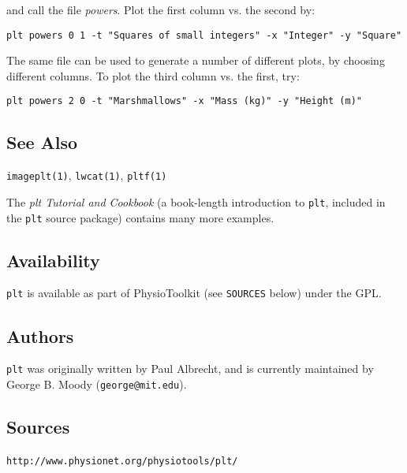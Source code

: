and call the file \textit{powers}.  Plot the first column vs. the second by: 

	\texttt{plt powers 0 1 -t "Squares of small integers" -x "Integer" -y "Square"}

 

The same file can be used to generate a number of different plots, by choosing
different columns.  To plot the third column vs. the first, try: 

	\texttt{plt powers 2 0 -t "Marshmallows" -x "Mass (kg)" -y "Height (m)"
} 
\subsection*{See Also}


\texttt{\textsf{imageplt}(1)}, \texttt{\textsf{lwcat}(1)}, \texttt{\textsf{pltf}(1)} 

The \textit{plt Tutorial and Cookbook} (a
book-length introduction to \texttt{plt}, included in the \texttt{plt} source package) contains
many more examples. 
\subsection*{Availability}
\texttt{plt} is available as part of PhysioToolkit
(see \texttt{SOURCES} below) under the GPL. 
\subsection*{Authors}
\texttt{plt} was originally written by
Paul Albrecht, and is currently maintained by George B. Moody (\texttt{george@mit.edu}).

\subsection*{Sources}
\texttt{http://www.physionet.org/physiotools/plt/} 
\

